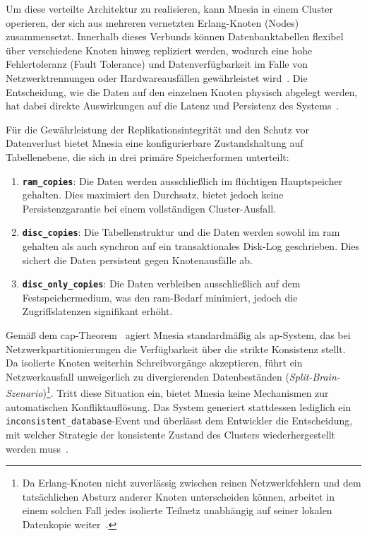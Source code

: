 Um diese verteilte Architektur zu realisieren, kann Mnesia in einem Cluster operieren, der sich aus mehreren vernetzten Erlang-Knoten (Nodes) zusammensetzt. Innerhalb dieses Verbunds können Datenbanktabellen flexibel über verschiedene Knoten hinweg repliziert werden, wodurch eine hohe Fehlertoleranz (Fault Tolerance) und Datenverfügbarkeit im Falle von Netzwerktrennungen oder Hardwareausfällen gewährleistet wird~\citep{mattsson1999mnesia}. Die Entscheidung, wie die Daten auf den einzelnen Knoten physisch abgelegt werden, hat dabei direkte Auswirkungen auf die Latenz und Persistenz des Systems~\citep{mnesia}.

Für die Gewährleistung der Replikationsintegrität und den Schutz vor Datenverlust bietet Mnesia eine konfigurierbare Zustandshaltung auf Tabellenebene, die sich in drei primäre Speicherformen unterteilt:

\begin{enumerate}
    \item \texttt{\textbf{ram\_copies}}: Die Daten werden ausschließlich im flüchtigen Hauptspeicher gehalten. Dies maximiert den Durchsatz, bietet jedoch keine Persistenzgarantie bei einem vollständigen Cluster-Ausfall.

    \item \texttt{\textbf{disc\_copies}}: Die Tabellenstruktur und die Daten werden sowohl im \gls{ram} gehalten als auch synchron auf ein transaktionales Disk-Log geschrieben. Dies sichert die Daten persistent gegen Knotenausfälle ab.

    \item \texttt{\textbf{disc\_only\_copies}}: Die Daten verbleiben ausschließlich auf dem Festspeichermedium, was den \gls{ram}-Bedarf minimiert, jedoch die Zugriffslatenzen signifikant erhöht.
\end{enumerate}

Gemäß dem \gls{cap}-Theorem~\citep{gilbert2002brewer} agiert Mnesia standardmäßig als \gls{ap}-System, das bei Netzwerkpartitionierungen die Verfügbarkeit über die strikte Konsistenz stellt. Da isolierte Knoten weiterhin Schreibvorgänge akzeptieren, führt ein Netzwerkausfall unweigerlich zu divergierenden Datenbeständen (\textit{Split-Brain-Szenario})\footnote{Da Erlang-Knoten nicht zuverlässig zwischen reinen Netzwerkfehlern und dem tatsächlichen Absturz anderer Knoten unterscheiden können, arbeitet in einem solchen Fall jedes isolierte Teilnetz unabhängig auf seiner lokalen Datenkopie weiter~\citep{cesarini2015designing}.}. Tritt diese Situation ein, bietet Mnesia keine Mechanismen zur automatischen Konfliktauflösung. Das System generiert stattdessen lediglich ein \texttt{inconsistent\_database}-Event und überlässt dem Entwickler die Entscheidung, mit welcher Strategie der konsistente Zustand des Clusters wiederhergestellt werden muss~\citep{mnesia}.

